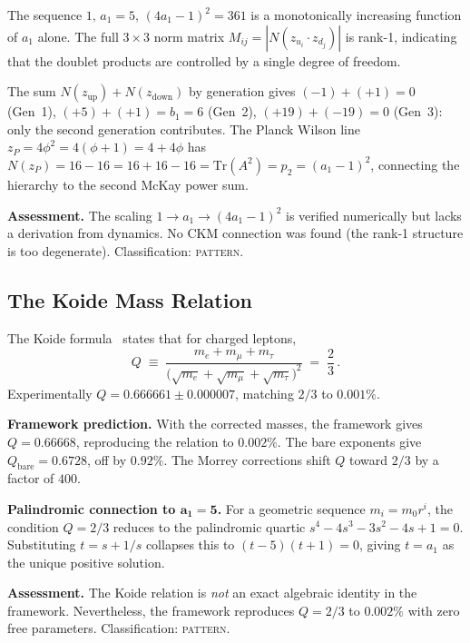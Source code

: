 \documentclass[12pt,a4paper]{article}
\theoremstyle{definition}
\begin{document}
The sequence $1,\, a_1 = 5,\, (4a_1-1)^2 = 361$ is a monotonically increasing function of $a_1$ alone.  The full $3 \times 3$ norm matrix $M_{ij} = |N(z_{u_i} \cdot z_{d_j})|$ is rank-1, indicating that the doublet products are controlled by a single degree of freedom.

The sum $N(z_{\text{up}}) + N(z_{\text{down}})$ by generation gives $(-1) + (+1) = 0$ (Gen~1), $(+5) + (+1) = b_1 = 6$ (Gen~2), $(+19) + (-19) = 0$ (Gen~3): only the second generation contributes.  The Planck Wilson line $z_P = 4\phi^2 = 4(\phi+1) = 4+4\phi$ has $N(z_P) = 16 - 16 = 16 + 16 - 16 = \mathrm{Tr}(A^2) = p_2 = (a_1-1)^2$, connecting the hierarchy to the second McKay power sum.

\textbf{Assessment.}  The scaling $1 \to a_1 \to (4a_1-1)^2$ is verified numerically but lacks a derivation from dynamics.  No CKM connection was found (the rank-1 structure is too degenerate).  Classification: \textsc{pattern}.

\subsection{The Koide Mass Relation}
\label{sec:S-koide}

The Koide formula~\cite{Koide1983} states that for charged leptons,
\begin{equation}
Q \;\equiv\; \frac{m_e + m_\mu + m_\tau}{\bigl(\sqrt{m_e} + \sqrt{m_\mu} + \sqrt{m_\tau}\bigr)^2} \;=\; \frac{2}{3}\,.
\end{equation}
Experimentally $Q = 0.666661 \pm 0.000007$, matching $2/3$ to $0.001\%$.

\textbf{Framework prediction.}  With the corrected masses, the framework gives $Q = 0.66668$, reproducing the relation to $0.002\%$.  The bare exponents give $Q_{\mathrm{bare}} = 0.6728$, off by $0.92\%$.  The Morrey corrections shift $Q$ toward $2/3$ by a factor of $400$.

\textbf{Palindromic connection to $\boldsymbol{a_1 = 5}$.}  For a geometric sequence $m_i = m_0 r^i$, the condition $Q = 2/3$ reduces to the palindromic quartic $s^4 - 4s^3 - 3s^2 - 4s + 1 = 0$.  Substituting $t = s + 1/s$ collapses this to $(t-5)(t+1) = 0$, giving $t = a_1$ as the unique positive solution.

\textbf{Assessment.}  The Koide relation is \emph{not} an exact algebraic identity in the framework.  Nevertheless, the framework reproduces $Q = 2/3$ to $0.002\%$ with zero free parameters.  Classification: \textsc{pattern}.
\end{document}
